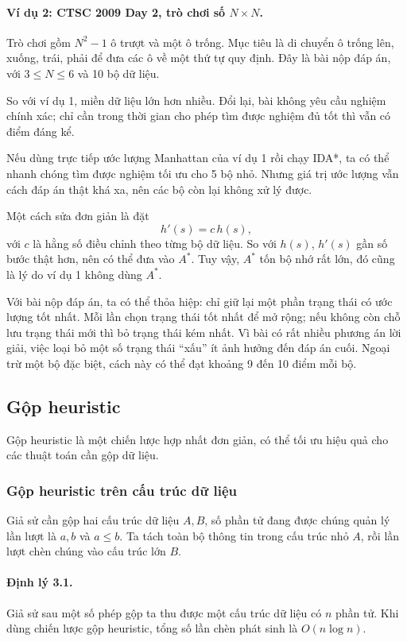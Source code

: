 \documentclass[11pt]{article}
\begin{document}
\paragraph{Ví dụ 2: CTSC 2009 Day 2, trò chơi số \(N\times N\).}
Trò chơi gồm \(N^2-1\) ô trượt và một ô trống. Mục tiêu là di chuyển ô trống
lên, xuống, trái, phải để đưa các ô về một thứ tự quy định. Đây là bài nộp đáp
án, với \(3\le N\le 6\) và 10 bộ dữ liệu.

So với ví dụ 1, miền dữ liệu lớn hơn nhiều. Đổi lại, bài không yêu cầu nghiệm
chính xác; chỉ cần trong thời gian cho phép tìm được nghiệm đủ tốt thì vẫn có
điểm đáng kể.

Nếu dùng trực tiếp ước lượng Manhattan của ví dụ 1 rồi chạy IDA*, ta có thể
nhanh chóng tìm được nghiệm tối ưu cho 5 bộ nhỏ. Nhưng giá trị ước lượng vẫn
cách đáp án thật khá xa, nên các bộ còn lại không xử lý được.

Một cách sửa đơn giản là đặt
\[
  h'(s)=c\,h(s),
\]
với \(c\) là hằng số điều chỉnh theo từng bộ dữ liệu. So với \(h(s)\),
\(h'(s)\) gần số bước thật hơn, nên có thể đưa vào \(A^*\). Tuy vậy, \(A^*\)
tốn bộ nhớ rất lớn, đó cũng là lý do ví dụ 1 không dùng \(A^*\).

Với bài nộp đáp án, ta có thể thỏa hiệp: chỉ giữ lại một phần trạng thái có ước
lượng tốt nhất. Mỗi lần chọn trạng thái tốt nhất để mở rộng; nếu không còn chỗ
lưu trạng thái mới thì bỏ trạng thái kém nhất. Vì bài có rất nhiều phương án
lời giải, việc loại bỏ một số trạng thái ``xấu'' ít ảnh hưởng đến đáp án cuối.
Ngoại trừ một bộ đặc biệt, cách này có thể đạt khoảng 9 đến 10 điểm mỗi bộ.

\subsection{Gộp heuristic}

Gộp heuristic là một chiến lược hợp nhất đơn giản, có thể tối ưu hiệu quả cho
các thuật toán cần gộp dữ liệu.

\subsubsection{Gộp heuristic trên cấu trúc dữ liệu}

Giả sử cần gộp hai cấu trúc dữ liệu \(A,B\), số phần tử đang được chúng quản lý
lần lượt là \(a,b\) và \(a\le b\). Ta tách toàn bộ thông tin trong cấu trúc nhỏ
\(A\), rồi lần lượt chèn chúng vào cấu trúc lớn \(B\).

\paragraph{Định lý 3.1.}
Giả sử sau một số phép gộp ta thu được một cấu trúc dữ liệu có \(n\) phần tử.
Khi dùng chiến lược gộp heuristic, tổng số lần chèn phát sinh là
\(O(n\log n)\).
\end{document}
